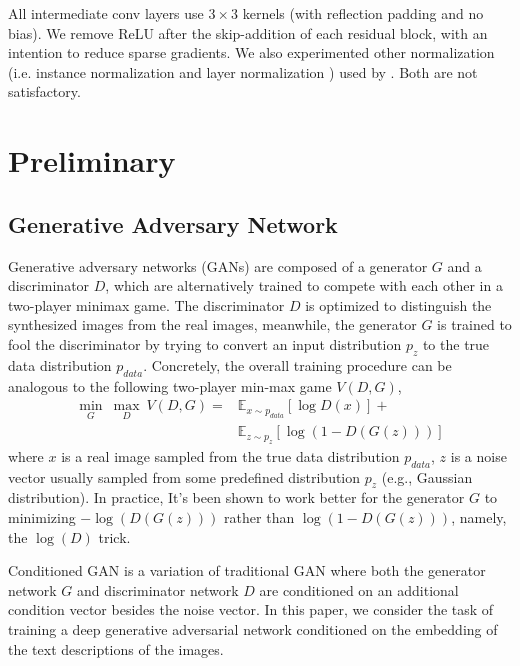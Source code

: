 \documentclass[10pt,twocolumn,letterpaper]{article}
\begin{document}
All intermediate conv layers use $3{\times}3$ kernels (with reflection padding and no bias). We remove ReLU after the skip-addition of each residual block, with an intention to reduce sparse gradients. 
We also experimented other normalization (i.e. instance normalization \cite{ulyanov2016instance} and layer normalization \cite{ba2016layer}) used by \cite{zhu2017unpaired,chen2017photographic}. Both are not satisfactory. 

\section{Preliminary}
\subsection{Generative Adversary Network}
Generative adversary networks (GANs) are composed of a generator $G$ and a discriminator $D$, which are alternatively trained to compete with each other in a two-player minimax game. The discriminator $D$ is optimized to distinguish the synthesized images from the real images, meanwhile, the generator $G$ is trained to fool the discriminator by trying to convert an input distribution $p_z$ to the true data distribution $p_{data}$. Concretely, the overall training procedure can be analogous to the following two-player min-max game $V(D, G)$,
\begin{equation}
\label{game}
\begin{split}
\underset{G}{\min}\ \underset{D}{\max}\ V(D, G) =  &\mathbb{E}_{x\sim p_{data}}[\log D(x)] +  \\
&\mathbb{E}_{z\sim p_{z}}[\log (1-D(G(z)))]		   
\end{split}
\end{equation}
where $x$ is a real image sampled from the true data distribution $p_{data}$, $z$ is a noise vector usually sampled from some predefined distribution $p_{z}$ (e.g., Gaussian distribution).
In practice, It's been shown to work better for the generator $G$ to minimizing $-\log(D(G(z)))$ rather than $\log(1-D(G(z)))$, namely, the $\log(D)$ trick.

Conditioned GAN \cite{isola2016image} is a variation of traditional GAN where both the generator network $G$ and discriminator network $D$ are conditioned on an additional condition vector besides the noise vector. In this paper, we consider the task of training a deep  generative adversarial network conditioned on the embedding of the text descriptions of the images.
\end{document}
